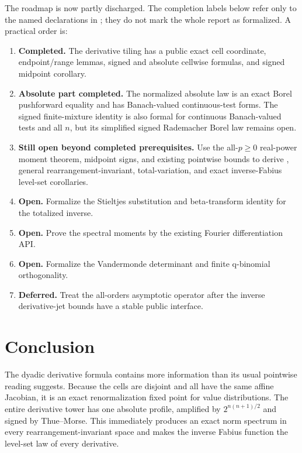 \documentclass[11pt,oneside]{article}
\theoremstyle{definition}
\theoremstyle{remark}
\begin{document}
The roadmap is now partly discharged.  The completion labels below refer only to the named
declarations in ; they do not mark the whole report
as formalized.  A practical order is:
\begin{enumerate}
\item \textbf{Completed.}  The derivative tiling has a public exact cell coordinate,
      endpoint/range lemmas, signed and absolute cellwise formulas, and signed midpoint
      corollary.
\item \textbf{Absolute part completed.}  The normalized absolute law is an exact Borel
      pushforward equality and has Banach-valued continuous-test forms.  The signed
      finite-mixture identity is also formal for continuous Banach-valued tests and all
      \(n\), but its simplified signed Rademacher Borel law remains open.
\item \textbf{Still open beyond completed prerequisites.}  Use the all-\(p\ge0\)
      real-power moment theorem, midpoint signs, and existing pointwise bounds to derive
      , general rearrangement-invariant, total-variation, and exact
      inverse-Fabius level-set corollaries.
\item \textbf{Open.}  Formalize the Stieltjes substitution and beta-transform identity for
      the totalized inverse.
\item \textbf{Open.}  Prove the spectral moments by the existing Fourier differentiation
      API.
\item \textbf{Open.}  Formalize the Vandermonde determinant and finite q-binomial
      orthogonality.
\item \textbf{Deferred.}  Treat the all-orders asymptotic operator after the inverse
      derivative-jet bounds have a stable public interface.
\end{enumerate}

\section{Conclusion}

The dyadic derivative formula contains more information than its usual pointwise reading
suggests.  Because the cells are disjoint and all have the same affine Jacobian, it is an
exact renormalization fixed point for value distributions.  The entire derivative tower has
one absolute profile, amplified by $2^{n(n+1)/2}$ and signed by Thue--Morse.  This immediately
produces an exact norm spectrum in every rearrangement-invariant space and makes the inverse
Fabius function the level-set law of every derivative.
\end{document}
